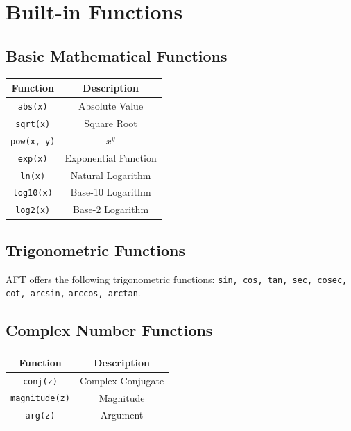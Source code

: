 \section{Built-in Functions}

\subsection{Basic Mathematical Functions}
\begin{table}[H]
    \centering
    \begin{tabular}{|c|c|}
        \hline
        \textbf{Function} & \textbf{Description} \\
        \hline
        \texttt{abs(x)} & Absolute Value \\
        \texttt{sqrt(x)} & Square Root \\
        \texttt{pow(x, y)} & $x^y$ \\
        \texttt{exp(x)} & Exponential Function \\
        \texttt{ln(x)} & Natural Logarithm \\
        \texttt{log10(x)} & Base-10 Logarithm \\
        \texttt{log2(x)} & Base-2 Logarithm \\
        \hline
    \end{tabular}
\end{table}

\subsection{Trigonometric Functions}
AFT offers the following trigonometric functions: \texttt{sin, cos, tan, sec, cosec, cot, arcsin,} \texttt{arccos, arctan}.

\subsection{Complex Number Functions}
\begin{table}[H]
    \centering
    \begin{tabular}{|c|c|}
        \hline
        \textbf{Function} & \textbf{Description} \\
        \hline
        \texttt{conj(z)} & Complex Conjugate \\
        \texttt{magnitude(z)} & Magnitude \\
        \texttt{arg(z)} & Argument \\
        \hline
    \end{tabular}
\end{table}


